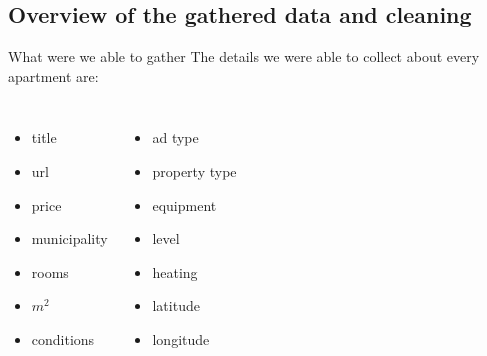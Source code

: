 \documentclass{beamer}
\begin{document}
    \subsection{Overview of the gathered data and cleaning}
      \begin{frame}{What were we able to gather}
        The details we were able to collect about every apartment are:
        \begin{columns}[T]
            \begin{itemize}
              \item[$\bullet$] title
              \item[$\bullet$] url
              \item[$\bullet$] price
              \item[$\bullet$] municipality
              \item[$\bullet$] rooms
              \item[$\bullet$] $m^2$
              \item[$\bullet$] conditions
            \end{itemize}

            \begin{itemize}
              \item[$\bullet$] ad type
              \item[$\bullet$] property type
              \item[$\bullet$] equipment
              \item[$\bullet$] level
              \item[$\bullet$] heating
              \item[$\bullet$] latitude
              \item[$\bullet$] longitude
            \end{itemize}
        \end{columns}
      \end{frame}
\end{document}
